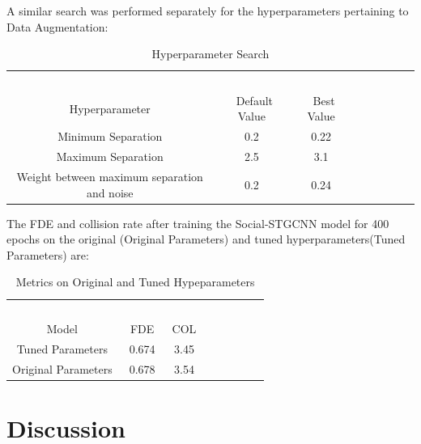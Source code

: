 {A similar search was performed separately for the hyperparameters pertaining to Data Augmentation:

\begin{table}[!h]
\caption{Hyperparameter Search} %
\centering %
\begin{tabular}{ccc rrrrr} 
\hline 
&\ \ \ \ \ \\
Hyperparameter&\ Default Value&\ Best Value&\ \\ [0.5ex]
\hline 
Minimum Separation &  0.2 & 0.22\\
Maximum Separation & 2.5 & 3.1\\
Weight between maximum separation and noise &  0.2 & 0.24\\
\hline
\end{tabular}
\label{tab:hresult}
\end{table}

The FDE and collision rate after training the Social-STGCNN model for 400 epochs on the original (Original Parameters) and tuned hyperparameters(Tuned Parameters) are:
\begin{table}[!h]
\caption{Metrics on Original and Tuned Hypeparameters} %
\centering %
\begin{tabular}{ccc rrrrr} 
\hline 
&\ \ \ \ \ \\
Model&\ FDE&\ COL&\ \\ [0.5ex]
\hline 
Tuned Parameters&\ 0.674&\ 3.45&\ \\
Original Parameters&\ 0.678&\ 3.54&\ \\

\hline
\end{tabular}
\label{tab:hresult}
\end{table}

\section{Discussion}

}
